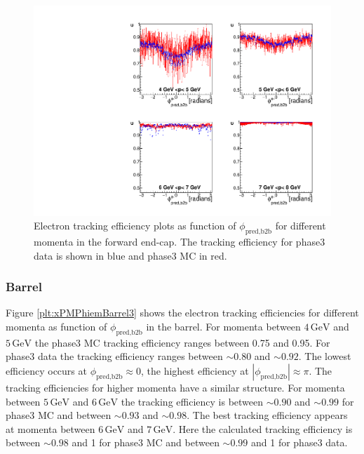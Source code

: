 \documentclass[a4paper,11pt,twosided,final,german,openbib,pdftex,listof=totoc,bibliography=totoc]{scrbook}
\begin{document}
\begin{figure}[!htbp]
	\centering
	\includegraphics[width=\textwidth]{Plots/master3/xPMPhiemFCP3}
	\caption[Momentum $\phi_{\textrm{pred,b2b}}$ Electron Forward End-Cap Efficiency Phase3]{Electron tracking efficiency plots as function of $\phi_{\textrm{pred,b2b}}$ for different momenta in the forward end-cap. The tracking efficiency for phase3 data is shown in blue and phase3 MC in red.}
	\label{plt:xPMPhiemFC3}
\end{figure}

\newpage
\subsubsection{Barrel}

Figure \ref{plt:xPMPhiemBarrel3} shows the electron tracking efficiencies for different momenta as function of $\phi_{\textrm{pred,b2b}}$ in the barrel.
For momenta between $4\,\textrm{GeV}$ and $5\,\textrm{GeV}$ the phase3 MC tracking efficiency ranges between 0.75 and 0.95. For phase3 data the tracking efficiency ranges between $ \sim 0.80$ and $\sim 0.92$. The lowest efficiency occurs at $\phi_{\textrm{pred,b2b}} \approx 0$, the highest efficiency at $|\phi_{\textrm{pred,b2b}}| \approx \pi$.
The tracking efficiencies for higher momenta have a similar structure. 
For momenta between $5\,\textrm{GeV}$ and $6\,\textrm{GeV}$ the tracking efficiency is between $\sim 0.90$ and $\sim 0.99$ for phase3 MC and between $\sim 0.93$ and $\sim 0.98$. The best tracking efficiency appears at momenta between $6\,\textrm{GeV}$ and $7\,\textrm{GeV}$. Here the calculated tracking efficiency is between $\sim 0.98$ and 1 for phase3 MC and between $\sim 0.99$ and 1 for phase3 data.
\end{document}
